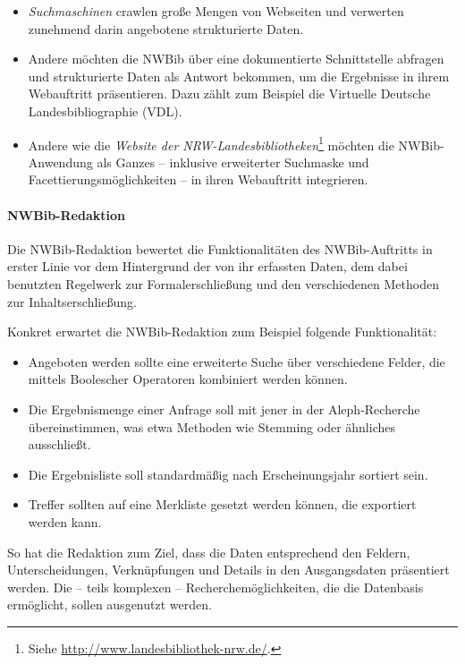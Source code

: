 \documentclass[a4paper,
fontsize=11pt,
oneside,
numbers=noperiodatend,
parskip=half-,
bibliography=totoc,
final
]{scrartcl}
\providecommand{\tightlist}{%
  \setlength{\itemsep}{0pt}\setlength{\parskip}{0pt}}
\begin{document}
\begin{itemize}
\tightlist
\item
  \emph{Suchmaschinen} crawlen große Mengen von Webseiten und verwerten
  zunehmend darin angebotene strukturierte Daten.
\item
  Andere möchten die NWBib über eine dokumentierte Schnittstelle
  abfragen und strukturierte Daten als Antwort bekommen, um die
  Ergebnisse in ihrem Webauftritt präsentieren. Dazu zählt zum Beispiel
  die Virtuelle Deutsche Landesbibliographie (VDL).
\item
  Andere wie die \emph{Website der NRW-Landesbibliotheken}\footnote{Siehe
    \url{http://www.landesbibliothek-nrw.de/}.} möchten die
  NWBib-Anwendung als Ganzes -- inklusive erweiterter Suchmaske und
  Facettierungsmöglichkeiten -- in ihren Webauftritt integrieren.
\end{itemize}

\paragraph{NWBib-Redaktion}\label{nwbib-redaktion}

Die NWBib-Redaktion bewertet die Funktionalitäten des NWBib-Auftritts in
erster Linie vor dem Hintergrund der von ihr erfassten Daten, dem dabei
benutzten Regelwerk zur Formalerschließung und den verschiedenen
Methoden zur Inhaltserschließung.

Konkret erwartet die NWBib-Redaktion zum Beispiel folgende
Funktionalität:

\begin{itemize}
\tightlist
\item
  Angeboten werden sollte eine erweiterte Suche über verschiedene
  Felder, die mittels Boolescher Operatoren kombiniert werden können.
\item
  Die Ergebnismenge einer Anfrage soll mit jener in der Aleph-Recherche
  übereinstimmen, was etwa Methoden wie Stemming oder ähnliches
  ausschließt.
\item
  Die Ergebnisliste soll standardmäßig nach Erscheinungsjahr sortiert
  sein.
\item
  Treffer sollten auf eine Merkliste gesetzt werden können, die
  exportiert werden kann.
\end{itemize}

So hat die Redaktion zum Ziel, dass die Daten entsprechend den Feldern,
Unterscheidungen, Verknüpfungen und Details in den Ausgangsdaten
präsentiert werden. Die -- teils komplexen -- Recherchemöglichkeiten,
die die Datenbasis ermöglicht, sollen ausgenutzt werden.
\end{document}
